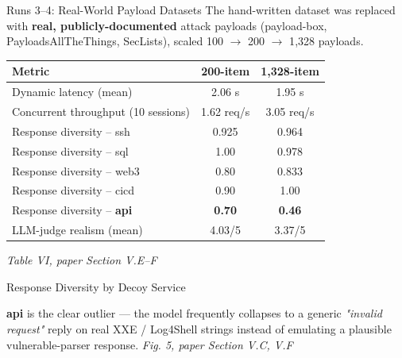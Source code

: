 \documentclass[aspectratio=169, 11pt]{beamer}
\newcommand{\srcnote}[1]{{\footnotesize\color{gray}\textit{#1}}}
\begin{document}
\begin{frame}{Runs 3--4: Real-World Payload Datasets}
    The hand-written dataset was replaced with \textbf{real, publicly-documented} attack payloads (payload-box, PayloadsAllTheThings, SecLists), scaled 100 $\to$ 200 $\to$ 1{,}328 payloads.
    \vspace{2mm}
    \scriptsize
    \renewcommand{\arraystretch}{1.2}
    \begin{tabular}{|l|c|c|}
        \hline
        \textbf{Metric} & \textbf{200-item} & \textbf{1{,}328-item} \\
        \hline
        Dynamic latency (mean) & 2.06 s & 1.95 s \\
        \hline
        Concurrent throughput (10 sessions) & 1.62 req/s & 3.05 req/s \\
        \hline
        Response diversity -- ssh & 0.925 & 0.964 \\
        \hline
        Response diversity -- sql & 1.00 & 0.978 \\
        \hline
        Response diversity -- web3 & 0.80 & 0.833 \\
        \hline
        Response diversity -- cicd & 0.90 & 1.00 \\
        \hline
        \rowcolor{amritaMaroon!15} Response diversity -- \textbf{api} & \textbf{0.70} & \textbf{0.46} \\
        \hline
        LLM-judge realism (mean) & 4.03/5 & 3.37/5 \\
        \hline
    \end{tabular}
    \srcnote{Table VI, paper Section V.E--F}
\end{frame}

\begin{frame}{Response Diversity by Decoy Service}
    \begin{center}
    \end{center}
    \textbf{api} is the clear outlier --- the model frequently collapses to a generic \textit{"invalid request"} reply on real XXE / Log4Shell strings instead of emulating a plausible vulnerable-parser response.
    \srcnote{Fig. 5, paper Section V.C, V.F}
\end{frame}
\end{document}
